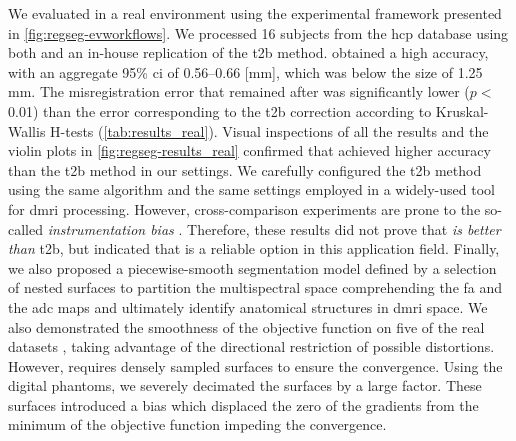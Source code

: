 We evaluated \regseg{} in a real environment using the experimental framework presented
  in \autoref{fig:regseg-evworkflows}.
We processed 16 subjects from the \gls*{hcp} database using both \regseg{}
  and an in-house replication of the \acrfull*{t2b} method.
\Regseg{} obtained a high accuracy, with an aggregate 95\% \gls*{ci} of 0.56--0.66 [mm], which was
  below the  size of 1.25 mm.
The misregistration error that remained after \regseg{} was significantly lower ($p <$ 0.01) than the
  error corresponding to the \gls*{t2b} correction according to Kruskal-Wallis H-tests
  (\autoref{tab:results_real}).
Visual inspections of all the results  and the violin plots in
  \autoref{fig:regseg-results_real} confirmed that \regseg{} achieved higher accuracy
  than the \gls*{t2b} method in our settings.
We carefully configured the \gls*{t2b} method using the same algorithm and the
  same settings employed in a widely-used tool for \gls*{dmri} processing.
However, cross-comparison experiments are prone to the so-called \emph{instrumentation bias}
  \citep{tustison_instrumentation_2013}.
Therefore, these results did not prove that \regseg{} \emph{is better than} \gls*{t2b},
  but indicated that \regseg{} is a reliable option in this application field.
Finally, we also proposed a piecewise-smooth segmentation model defined by
  a selection of nested surfaces to partition the multispectral space
  comprehending the \gls*{fa} and the \gls*{adc} maps and ultimately identify anatomical
  structures in \gls*{dmri} space.
We also demonstrated the smoothness of the objective function on five of the real datasets
  , taking advantage of the directional
  restriction of possible distortions.
However, \regseg{} requires densely sampled surfaces to ensure the convergence.
Using the digital phantoms, we severely decimated the surfaces by a large factor.
These surfaces introduced a bias which displaced the zero of the gradients from the
  minimum of the objective function impeding the convergence.

